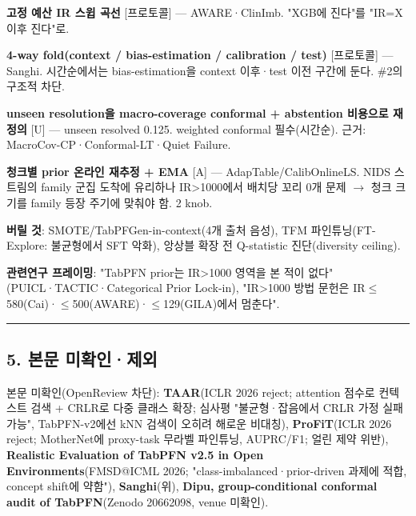 \par\noindent \textbullet\enspace \textbf{고정 예산 IR 스윕 곡선} [프로토콜] — AWARE·ClinImb. "XGB에 진다"를 "IR=\allowbreak{}X 이후 진다"로.


\par\noindent \textbullet\enspace \textbf{4-way fold(context /\allowbreak{} bias-estimation /\allowbreak{} calibration /\allowbreak{} test)} [프로토콜] — Sanghi. 시간순에서는 bias-estimation을 context 이후·test 이전 구간에 둔다. \#2의 구조적 차단.


\par\noindent \textbullet\enspace \textbf{unseen resolution을 macro-coverage conformal +\allowbreak{} abstention 비용으로 재정의} [U] — unseen resolved 0.125. weighted conformal 필수(시간순). 근거: MacroCov-CP·Conformal-LT·Quiet Failure.


\par\noindent \textbullet\enspace \textbf{청크별 prior 온라인 재추정 +\allowbreak{} EMA} [A] — AdapTable/\allowbreak{}CalibOnlineLS. NIDS 스트림의 family 군집 도착에 유리하나 IR>1000에서 배치당 꼬리 0개 문제  \ensuremath{\rightarrow}  청크 크기를 family 등장 주기에 맞춰야 함. 2 knob.


\par\noindent \textbullet\enspace \textbf{버릴 것}: SMOTE/\allowbreak{}TabPFGen-in-context(4개 출처 음성), TFM 파인튜닝(FT-Explore: 불균형에서 SFT 악화), 앙상블 확장 전 Q-statistic 진단(diversity ceiling).


\par\noindent \textbullet\enspace \textbf{관련연구 프레이밍}: "TabPFN prior는 IR>1000 영역을 본 적이 없다"(PUICL·TACTIC·Categorical Prior Lock-in), "IR>1000 방법 문헌은 IR\ensuremath{\leq}580(Cai)·\ensuremath{\leq}500(AWARE)·\ensuremath{\leq}129(GILA)에서 멈춘다".



\medskip\hrule\medskip
\subsection{5. 본문 미확인·제외}
\par\noindent \textbullet\enspace 본문 미확인(OpenReview 차단): \textbf{TAAR}(ICLR 2026 reject; attention 점수로 컨텍스트 검색 +\allowbreak{} CRLR로 다중 클래스 확장; 심사평 "불균형·잡음에서 CRLR 가정 실패 가능", TabPFN-v2에선 kNN 검색이 오히려 해로운 비대칭), \textbf{ProFiT}(ICLR 2026 reject; MotherNet에 proxy-task 무라벨 파인튜닝, AUPRC/\allowbreak{}F1; 얼린 제약 위반), \textbf{Realistic Evaluation of TabPFN v2.5 in Open Environments}(FMSD@ICML 2026; "class-imbalanced·prior-driven 과제에 적합, concept shift에 약함"), \textbf{Sanghi}(위), \textbf{Dipu, group-conditional conformal audit of TabPFN}(Zenodo 20662098, venue 미확인).


